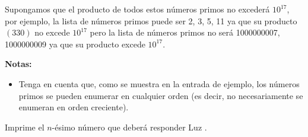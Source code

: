 Supongamos que el producto de todos estos números primos no excederá $10^{17}$, por ejemplo, la lista de números primos puede ser {2, 3, 5, 11} ya que su producto $(330)$ no excede $10^{17}$ pero la lista de números primos no será {1000000007, 1000000009} ya que su producto excede $10^{17}$.



\textbf{Notas:}

\begin{itemize}
    \item  Tenga en cuenta que, como se muestra en la entrada de ejemplo, los números primos se pueden enumerar en cualquier orden (es decir, no necesariamente se enumeran en orden creciente).
\end{itemize}

\outputText

Imprime el $n$-ésimo número que deberá responder Luz  .

\exampleCases

\begin{example}
\end{example}

